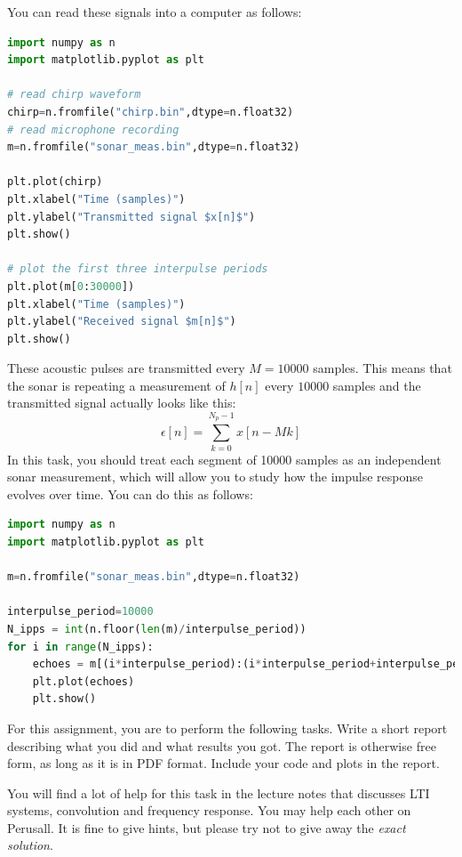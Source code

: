 You can read these signals into a
computer as follows:
\begin{lstlisting}[language=Python,numbers=none]
import numpy as n
import matplotlib.pyplot as plt

# read chirp waveform
chirp=n.fromfile("chirp.bin",dtype=n.float32)
# read microphone recording 
m=n.fromfile("sonar_meas.bin",dtype=n.float32)

plt.plot(chirp)
plt.xlabel("Time (samples)")
plt.ylabel("Transmitted signal $x[n]$")
plt.show()

# plot the first three interpulse periods 
plt.plot(m[0:30000])
plt.xlabel("Time (samples)")
plt.ylabel("Received signal $m[n]$")
plt.show()
\end{lstlisting}
These acoustic pulses are transmitted every $M=10000$ samples. This
means that the sonar is repeating a measurement of $h[n]$ every
$10000$ samples and the transmitted signal actually looks like this:
\begin{equation}
  \epsilon[n] = \sum_{k=0}^{N_p-1} x[n - Mk]
\end{equation}
In this task, you should treat each segment of 10000 samples as an
independent sonar measurement, which will allow you to study how the
impulse response evolves over time. You can do this as follows:
\begin{lstlisting}[language=Python,numbers=none]
import numpy as n
import matplotlib.pyplot as plt

m=n.fromfile("sonar_meas.bin",dtype=n.float32)

interpulse_period=10000
N_ipps = int(n.floor(len(m)/interpulse_period))
for i in range(N_ipps):
    echoes = m[(i*interpulse_period):(i*interpulse_period+interpulse_period)]
    plt.plot(echoes)
    plt.show()
\end{lstlisting}

For this assignment, you are to perform the following tasks. Write a
short report describing what you did and what results you got. The
report is otherwise free form, as long as it is in PDF format. Include
your code and plots in the report. 

You will find a lot of help for this task in the lecture notes that
discusses LTI systems, convolution and frequency response. You may
help each other on Perusall. It is fine to give hints, but please try
not to give away the \emph{exact solution}.

